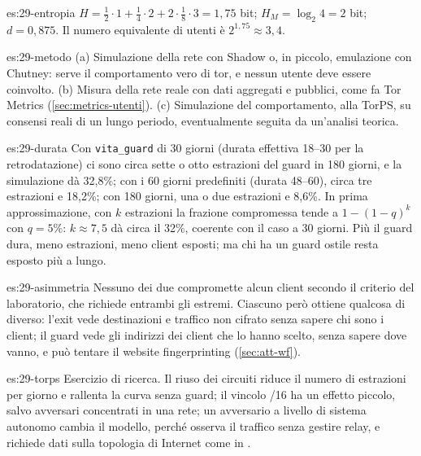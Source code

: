 \begin{soluzione}{es:29-entropia}
$H = \tfrac12 \cdot 1 + \tfrac14 \cdot 2 + 2 \cdot \tfrac18 \cdot 3 = 1{,}75$ bit; $H_M = \log_2 4 = 2$ bit; $d = 0{,}875$. Il numero equivalente di utenti è $2^{1{,}75} \approx 3{,}4$.
\end{soluzione}

\begin{soluzione}{es:29-metodo}
(a) Simulazione della rete con Shadow o, in piccolo, emulazione con Chutney: serve il comportamento vero di tor, e nessun utente deve essere coinvolto. (b) Misura della rete reale con dati aggregati e pubblici, come fa Tor Metrics (\cref{sec:metrics-utenti}). (c) Simulazione del comportamento, alla TorPS, su consensi reali di un lungo periodo, eventualmente seguita da un'analisi teorica.
\end{soluzione}

\begin{soluzione}{es:29-durata}
Con \texttt{vita\_guard} di 30 giorni (durata effettiva 18--30 per la retrodatazione) ci sono circa sette o otto estrazioni del guard in 180 giorni, e la simulazione dà 32,8\%; con i 60 giorni predefiniti (durata 48--60), circa tre estrazioni e 18,2\%; con 180 giorni, una o due estrazioni e 8,6\%. In prima approssimazione, con $k$ estrazioni la frazione compromessa tende a $1-(1-q)^k$ con $q = 5\%$: $k\approx 7,5$ dà circa il 32\%, coerente con il caso a 30 giorni. Più il guard dura, meno estrazioni, meno client esposti; ma chi ha un guard ostile resta esposto più a lungo.
\end{soluzione}

\begin{soluzione}{es:29-asimmetria}
Nessuno dei due compromette alcun client secondo il criterio del laboratorio, che richiede entrambi gli estremi. Ciascuno però ottiene qualcosa di diverso: l'exit vede destinazioni e traffico non cifrato senza sapere chi sono i client; il guard vede gli indirizzi dei client che lo hanno scelto, senza sapere dove vanno, e può tentare il website fingerprinting (\cref{sec:att-wf}).
\end{soluzione}

\begin{soluzione}{es:29-torps}
Esercizio di ricerca. Il riuso dei circuiti riduce il numero di estrazioni per giorno e rallenta la curva senza guard; il vincolo /16 ha un effetto piccolo, salvo avversari concentrati in una rete; un avversario a livello di sistema autonomo cambia il modello, perché osserva il traffico senza gestire relay, e richiede dati sulla topologia di Internet come in \cite{johnson2013users}.
\end{soluzione}

